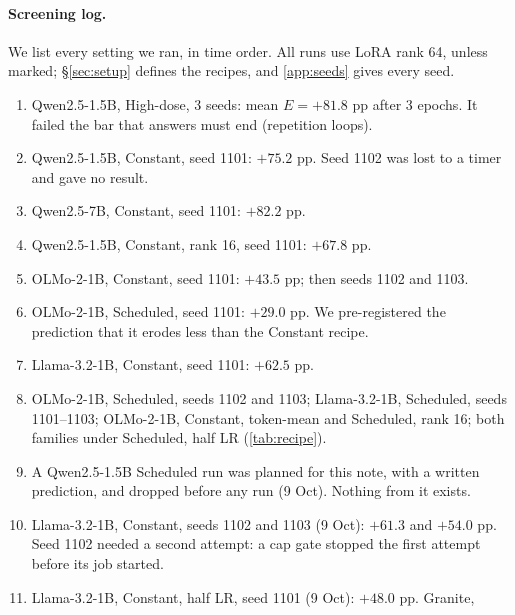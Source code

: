 \documentclass{article}
\begin{document}
\paragraph{Screening log.} We list every setting we ran, in time order. All
runs use LoRA rank 64, unless marked; \S\ref{sec:setup} defines the recipes,
and \cref{app:seeds} gives every seed.
\begin{enumerate}
  \item Qwen2.5-1.5B, High-dose, 3 seeds: mean $E = +81.8$ pp after 3 epochs.
        It failed the bar that answers must end (repetition loops).
  \item Qwen2.5-1.5B, Constant, seed 1101: $+75.2$ pp. Seed 1102 was lost to a
        timer and gave no result.
  \item Qwen2.5-7B, Constant, seed 1101: $+82.2$ pp.
  \item Qwen2.5-1.5B, Constant, rank 16, seed 1101: $+67.8$ pp.
  \item OLMo-2-1B, Constant, seed 1101: $+43.5$ pp; then seeds 1102 and 1103.
  \item OLMo-2-1B, Scheduled, seed 1101: $+29.0$ pp. We pre-registered the
        prediction that it erodes less than the Constant recipe.
  \item Llama-3.2-1B, Constant, seed 1101: $+62.5$ pp.
  \item OLMo-2-1B, Scheduled, seeds 1102 and 1103; Llama-3.2-1B, Scheduled,
        seeds 1101--1103; OLMo-2-1B, Constant, token-mean and Scheduled, rank
        16; both families under Scheduled, half LR (\cref{tab:recipe}).
  \item A Qwen2.5-1.5B Scheduled run was planned for this note, with a written
        prediction, and dropped before any run (9 Oct). Nothing from it exists.
  \item Llama-3.2-1B, Constant, seeds 1102 and 1103 (9 Oct): $+61.3$ and
        $+54.0$ pp. Seed 1102 needed a second attempt: a cap gate stopped the
        first attempt before its job started.
  \item Llama-3.2-1B, Constant, half LR, seed 1101 (9 Oct): $+48.0$ pp. Granite,

\end{enumerate}
\end{document}
